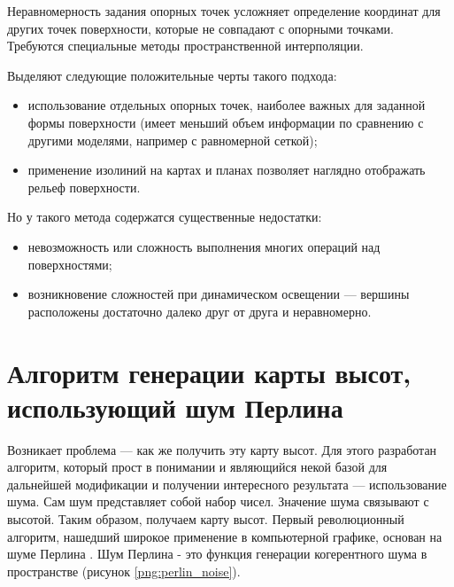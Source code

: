 Неравномерность задания опорных точек усложняет определение координат для других точек поверхности, которые не совпадают с опорными точками. Требуются специальные методы пространственной интерполяции.

Выделяют следующие положительные черты такого подхода:
\begin{itemize}
	\item использование отдельных опорных точек, наиболее важных для заданной формы поверхности (имеет меньший объем информации по сравнению с другими моделями, например с равномерной сеткой);
	\item применение изолиний на картах и планах позволяет наглядно отображать рельеф поверхности.
\end{itemize}

Но у такого метода содержатся существенные недостатки:
\begin{itemize}
	\item невозможность или сложность выполнения многих операций над поверхностями;
	\item возникновение сложностей при динамическом освещении — вершины расположены достаточно далеко друг от друга и неравномерно.
\end{itemize}

\section{Алгоритм генерации карты высот, использующий шум Перлина}
Возникает проблема — как же получить эту карту высот. Для этого разработан алгоритм, который прост в понимании и являющийся некой базой для дальнейшей модификации и получении интересного результата — использование шума. Сам шум представляет собой набор чисел. Значение шума связывают с высотой. Таким образом, получаем карту высот. 
Первый революционный алгоритм, нашедший широкое применение в компьютерной графике, основан на шуме Перлина \cite{perlin_noise}. Шум Перлина - это функция генерации когерентного шума в пространстве (рисунок \ref{png:perlin_noise}). 

\begin{figure}[H]
\end{figure}

